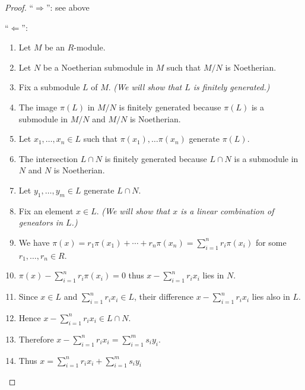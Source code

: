 \documentclass[a4paper]{book}
\theoremstyle{definition}
\begin{document}
\begin{proof}
    ``\(\Rightarrow\)'': see above

    ``\(\Leftarrow\)'':
    \begin{enumerate}
        \item Let \(M\) be an \(R\)-module.
        \item Let \(N\) be a Noetherian submodule in \(M\) such that \(M / N\) is Noetherian.
        \item Fix a submodule \(L\) of \(M\). \textit{(We will show that \(L\) is finitely generated.)}
        \item The image \(\pi(L)\) in \(M / N\) is finitely generated because \(\pi(L)\) is a submodule in \(M / N\) and \(M / N\) is Noetherian.
        \item Let \(x_1, \ldots, x_n \in L\) such that \(\pi(x_1), \ldots \pi(x_n)\) generate \(\pi(L)\).
        \item The intersection \(L \cap N\) is finitely generated because \(L \cap N\) is a submodule in \(N\) and \(N\) is Noetherian.
        \item Let \(y_1, \ldots, y_m \in L\) generate \(L \cap N\).
        \item Fix an element \(x \in L\). \textit{(We will show that \(x\) is a linear combination of geneators in \(L\).)}
        \item We have \(\pi(x) = r_1 \pi(x_1) + \cdots + r_n \pi(x_n) = \sum_{i = 1}^n r_i \pi(x_i)\) for some \(r_1, \ldots, r_n \in R\).
        \item \(\pi(x) - \sum_{i = 1}^n r_i \pi(x_i) = 0\) thus \(x - \sum_{i=1}^n r_i x_i\) lies in \(N\).
        \item Since \(x \in L\) and \(\sum_{i = 1}^n r_i x_i \in L\), their difference \(x - \sum_{i = 1}^n r_i x_i\) lies also in \(L\).
        \item Hence \(x - \sum_{i = 1}^n r_i x_i \in L \cap N\).
        \item Therefore \(x - \sum_{i = 1}^n r_i x_i = \sum_{i=1}^m s_i y_i\).
        \item Thus \(x = \sum_{i = 1}^n r_i x_i + \sum_{i=1}^m s_i y_i\)
    \end{enumerate}
\end{proof}


\newpage
\end{document}
